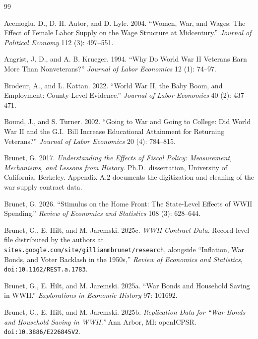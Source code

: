 \documentclass[12pt]{article}
\begin{document}
\begin{thebibliography}{99}

Acemoglu, D., D. H. Autor, and D. Lyle. 2004. ``Women, War, and Wages: The Effect of Female Labor Supply on the Wage Structure at Midcentury.'' \emph{Journal of Political Economy} 112 (3): 497--551.

Angrist, J. D., and A. B. Krueger. 1994. ``Why Do World War II Veterans Earn More Than Nonveterans?'' \emph{Journal of Labor Economics} 12 (1): 74--97.

Brodeur, A., and L. Kattan. 2022. ``World War II, the Baby Boom, and Employment: County-Level Evidence.'' \emph{Journal of Labor Economics} 40 (2): 437--471.

Bound, J., and S. Turner. 2002. ``Going to War and Going to College: Did World War II and the G.I.\ Bill Increase Educational Attainment for Returning Veterans?'' \emph{Journal of Labor Economics} 20 (4): 784--815.

Brunet, G. 2017. \emph{Understanding the Effects of Fiscal Policy: Measurement, Mechanisms, and Lessons from History}. Ph.D.\ dissertation, University of California, Berkeley. Appendix A.2 documents the digitization and cleaning of the war supply contract data.

Brunet, G. 2026. ``Stimulus on the Home Front: The State-Level Effects of WWII Spending.'' \emph{Review of Economics and Statistics} 108 (3): 628--644.

Brunet, G., E. Hilt, and M. Jaremski. 2025c. \emph{WWII Contract Data}. Record-level file distributed by the authors at \texttt{sites.google.com/site/gillianmbrunet/research}, alongside ``Inflation, War Bonds, and Voter Backlash in the 1950s,'' \emph{Review of Economics and Statistics}, \texttt{doi:10.1162/REST.a.1783}.

Brunet, G., E. Hilt, and M. Jaremski. 2025a. ``War Bonds and Household Saving in WWII.'' \emph{Explorations in Economic History} 97: 101692.

Brunet, G., E. Hilt, and M. Jaremski. 2025b. \emph{Replication Data for ``War Bonds and Household Saving in WWII.''} Ann Arbor, MI: openICPSR. \texttt{doi:10.3886/E226845V2}.


\end{thebibliography}
\end{document}
